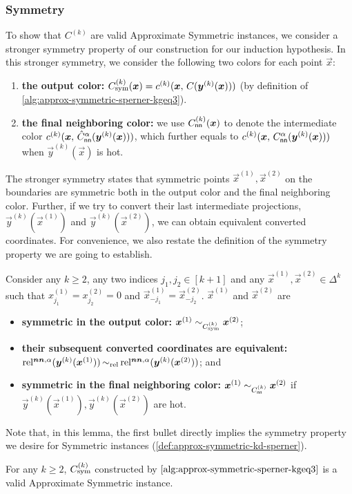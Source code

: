 \subsubsection{Symmetry}
To show that $C^{(k)}$ are valid \outofk Approximate Symmetric \Sperner instances, we consider a stronger symmetry property of our construction 
for our induction hypothesis.
In this stronger symmetry, we consider the following two colors for each point $\vec{x}$:
\begin{enumerate}[itemsep=0.2em, topsep=0.5em]
    \item {\bf the output color:} 
    $\Csym{k}(\vec{x}) = c^{(k)}(\vec{x},\, C(\vec{y}^{(k)}(\vec{x})))$ (by definition of \cref{alg:approx-symmetric-sperner-kgeq3}). 
    \item {\bf the final neighboring color:} we use $C^{(k)}_{\sf nn}(\vec{x})$ to denote the intermediate color $c^{(k)}(\vec{x},\, \hat{C}_{\sf nn}^{\alpha}(\vec{y}^{(k)}(\vec{x})))$, which further equals to $c^{(k)}(\vec{x},\, C_{\sf nn}^{\alpha}(\vec{y}^{(k)}(\vec{x})))$ when $\vec{y}^{(k)}(\vec{x})$ is hot.
\end{enumerate}

The stronger symmetry states that symmetric points $\vec{x}^{(1)}, \vec{x}^{(2)}$ on the boundaries are symmetric both in the output color and the final neighboring color.
Further, if we try to convert their last intermediate projections, $\vec{y}^{(k)}(\vec{x}^{(1)})$ and $\vec{y}^{(k)}(\vec{x}^{(2)})$, we can obtain equivalent converted coordinates. 
For convenience, we also restate the definition of the symmetry property we are going to establish.
\symmetrydef*
\symsperner*
\begin{lemma}
    \label{lem:stronger-symmetry}
    Consider any $k\geq 2$, any two indices $j_1,j_2\in [k+1]$ and any $\vec{x}^{(1)}, \vec{x}^{(2)}\in \Delta^{k}$ such that $x^{(1)}_{j_1}=x^{(2)}_{j_2}=0$ and $\vec{x}^{(1)}_{-j_1} = \vec{x}^{(2)}_{-j_2}$.  
    $\vec{x}^{(1)}$ and $\vec{x}^{(2)}$ are
    \begin{itemize}[itemsep=0.2em, topsep=0.5em]
        \item {\bf symmetric in the output color:} $\vec{x}^{(1)}\sim_{\Csym{k}} \vec{x}^{(2)}$;
        \item {\bf their subsequent converted coordinates are equivalent:} $\rela(\vec{y}^{(k)}(\vec{x}^{(1)})) \simrel \rela(\vec{y}^{(k)}(\vec{x}^{(2)}))$; and
        \item {\bf symmetric in the final neighboring color:} $\vec{x}^{(1)} \sim_{C^{(k)}_{\sf nn}} \vec{x}^{(2)}$ if $\vec{y}^{(k)}(\vec{x}^{(1)}), \vec{y}^{(k)}(\vec{x}^{(2)})$ are hot. 
    \end{itemize}
\end{lemma}
\noindent
Note that, in this lemma, the first bullet directly implies the symmetry property we desire for Symmetric \Sperner instances (\cref{def:approx-symmetric-kd-sperner}). 
\begin{corollary}
    For any $k\geq 2$, $\Csym{k}$ constructed by $\cref{alg:approx-symmetric-sperner-kgeq3}$ is a valid \outofk Approximate Symmetric \Sperner instance.
\end{corollary}

